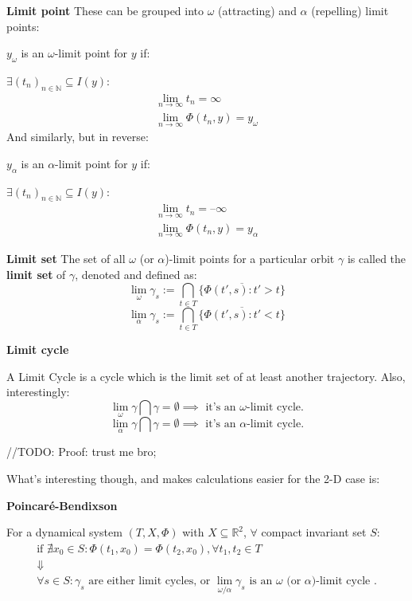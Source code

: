 \begin{definition}\textbf{Limit point}
	These can be grouped into $\omega$ (attracting) and $\alpha$ (repelling) limit points:

	$y_\omega$ is an $\omega$-limit point  for $y$ if:

	$\exists (t_n)_{n \in \mathbb{N}} \subseteq I(y) : $
	\begin{gather*}
		\lim_{n \rightarrow \infty} t_n = \infty  \\
		\lim_{n \rightarrow \infty} \Phi(t_n,y) = y_\omega
	\end{gather*}
	And similarly, but in reverse:

	$y_\alpha$ is an $\alpha$-limit point  for $y$ if:

	$\exists (t_n)_{n \in \mathbb{N}} \subseteq I(y) : $
	\begin{gather*}
		\lim_{n \rightarrow \infty} t_n = \textbf{--} \infty  \\
		\lim_{n \rightarrow \infty} \Phi(t_n,y) = y_\alpha
	\end{gather*}
\end{definition}

\begin{definition}\textbf{Limit set}
	The set of all $\omega$ (or $\alpha$)-limit points for a particular orbit $\gamma$ is called the \textbf{limit set} of $\gamma$, denoted and defined as:
	\[
		\lim_{\omega}\gamma_s := \bigcap_{t \in T} \overline{ \{ \Phi(t', s) : t' > t \} }
	\]
	\[
		\lim_{\alpha}\gamma_s := \bigcap_{t \in T} \overline{ \{ \Phi(t', s) : t' < t \} }
	\]
\end{definition}

\begin{definition} \textbf{Limit cycle}

	A Limit Cycle is a cycle which is the limit set of at least another trajectory.
	Also, interestingly:
	\[
		\lim_{\omega}\gamma \bigcap \gamma  = \emptyset \implies \text{ it's an } \omega \text{-limit cycle}.
	\]
	\[
		\lim_{\alpha}\gamma \bigcap \gamma  = \emptyset \implies \text{ it's an } \alpha \text{-limit cycle}.
	\]
\end{definition}

//TODO: Proof: trust me bro;

What's interesting though, and makes calculations easier for the 2-D case is:
\begin{theorem}  \textbf{Poincaré-Bendixson}

	For a dynamical system $(T,X,\Phi)$ with $X \subseteq \mathbb{R}^2$, $\forall$ compact invariant set $S$:
	\begin{gather*}
		\text{if } \nexists x_0 \in S : \Phi(t_1, x_0) = \Phi(t_2,x_0), \forall t_1,t_2 \in T \\
		\Downarrow \\
		\forall s \in S: \gamma_s \text{ are either limit cycles, or } \lim_{\omega / \alpha}\gamma_s \text{ is an $\omega$ (or $\alpha$)-limit cycle }.
	\end{gather*}
\end{theorem}


